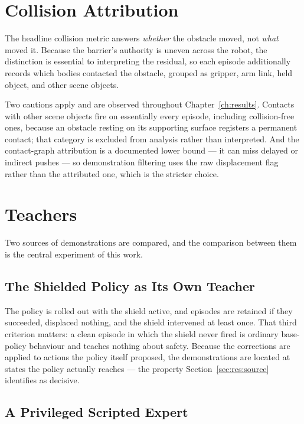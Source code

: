 \section{Collision Attribution}\label{sec:attribution}

The headline collision metric answers \emph{whether} the obstacle moved, not \emph{what} moved it.
Because the barrier's authority is uneven across the robot, the distinction is essential to
interpreting the residual, so each episode additionally records which bodies contacted the
obstacle, grouped as gripper, arm link, held object, and other scene objects.

Two cautions apply and are observed throughout Chapter~\ref{ch:results}. Contacts with other scene
objects fire on essentially every episode, including collision-free ones, because an obstacle
resting on its supporting surface registers a permanent contact; that category is excluded from
analysis rather than interpreted. And the contact-graph attribution is a documented lower bound ---
it can miss delayed or indirect pushes --- so demonstration filtering uses the raw displacement
flag rather than the attributed one, which is the stricter choice.

\section{Teachers}\label{sec:teachers}

Two sources of demonstrations are compared, and the comparison between them is the central
experiment of this work.

\subsection{The Shielded Policy as Its Own Teacher}\label{sec:teacher_self}

The policy is rolled out with the shield active, and episodes are retained if they succeeded,
displaced nothing, and the shield intervened at least once. That third criterion matters: a clean
episode in which the shield never fired is ordinary base-policy behaviour and teaches nothing about
safety. Because the corrections are applied to actions the policy itself proposed, the
demonstrations are located at states the policy actually reaches --- the property
Section~\ref{sec:res:source} identifies as decisive.

\subsection{A Privileged Scripted Expert}\label{sec:teacher_planner}

